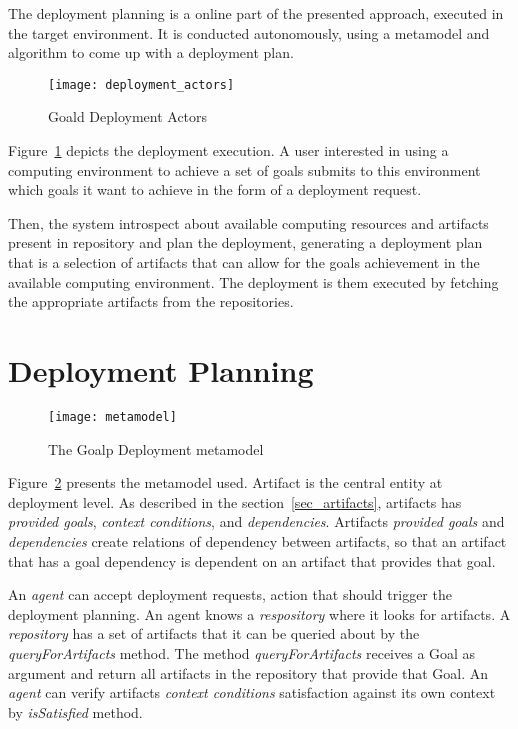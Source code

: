 
The deployment planning is a online part of the presented approach, executed in the target environment. It is conducted autonomously, using a metamodel and algorithm to come up with a deployment plan.

\begin{figure}[!htb]
  \centering
  \texttt{[image: deployment\_actors]}
  \caption{Goald Deployment Actors}
\label{fig:deployment_actors}
\end{figure}

Figure~\ref{fig:deployment_actors} depicts the deployment execution. A user interested in using a computing environment to achieve a set of goals submits to this environment which goals it want to achieve in the form of a deployment request.

Then, the system introspect about available computing resources and artifacts present in repository and plan the deployment, generating a deployment plan that is a selection of artifacts that can allow for the goals achievement in the available computing environment. The deployment is them executed by fetching the appropriate artifacts from the repositories.


\section{Deployment Planning}
\label{sec:planning}



\begin{figure}[!htb]
  \centering
  \texttt{[image: metamodel]}
  \caption{The Goalp Deployment metamodel}
  \label{fig:metamodel}
\end{figure}

Figure~\ref{fig:metamodel} presents the metamodel used. Artifact is the central entity at deployment level. As described in the section~\ref{sec_artifacts}, artifacts has \emph{provided goals}, \emph{context conditions}, and \emph{dependencies}.
Artifacts \emph{provided goals} and \emph{dependencies} create relations of dependency between artifacts, so that an artifact that has a goal dependency is dependent on an artifact that provides that goal. %

An \emph{agent} can accept deployment requests, action that should trigger the deployment planning. An agent knows a \emph{respository} where it looks for artifacts.
A \emph{repository} has a set of artifacts that it can be queried about by the \emph{queryForArtifacts} method. The method \emph{queryForArtifacts} receives a Goal as argument and return all artifacts in the repository that provide that Goal. An \emph{agent} can verify artifacts \emph{context conditions} satisfaction against its own context by \emph{isSatisfied} method.

